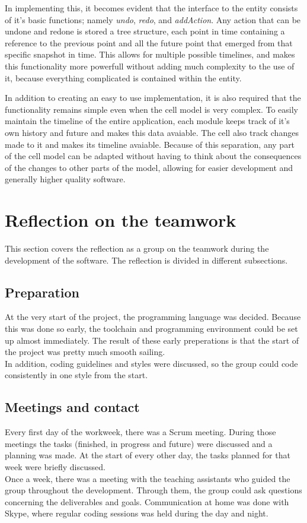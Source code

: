 \documentclass[10pt,a4paper]{report}
\begin{document}
			In implementing this, it becomes evident that the interface to the entity consists of it's basic functions; namely \emph{undo}, \emph{redo}, and \emph{addAction}. Any action that can be undone and redone is stored a tree structure, each point in time containing a reference to the previous point and all the future point that emerged from that specific snapshot in time. This allows for multiple possible timelines, and makes this functionality more powerfull without adding much complexity to the use of it, because everything complicated is contained within the entity.

			In addition to creating an easy to use implementation, it is also required that the functionality remains simple even when the cell model is very complex. To easily maintain the timeline of the entire application, each module keeps track of it's own history and future and makes this data avaiable. The cell also track changes made to it and makes its timeline avaiable. Because of this separation, any part of the cell model can be adapted without having to think about the consequences of the changes to other parts of the model, allowing for easier development and generally higher quality software.
	
	\section{Reflection on the teamwork}
		This section covers the reflection as a group on the teamwork during the development of the software. The reflection is divided in different subsections.
		\subsection{Preparation}
			At the very start of the project, the programming language was decided. Because this was done so early, the toolchain and programming environment could be set up almost immediately. The result of these early preperations is that the start of the project was pretty much smooth sailing. \\
			In addition, coding guidelines and styles were discussed, so the group could code consistently in one style from the start.
		
		\subsection{Meetings and contact}
			Every first day of the workweek, there was a Scrum meeting. During those meetings the tasks (finished, in progress and future) were discussed and a planning was made. At the start of every other day, the tasks planned for that week were briefly discussed. \\
			Once a week, there was a meeting with the teaching assistants who guided the group throughout the development. Through them, the group could ask questions concerning the deliverables and goals.
			Communication at home was done with Skype, where regular coding sessions was held during the day and night.
\end{document}

